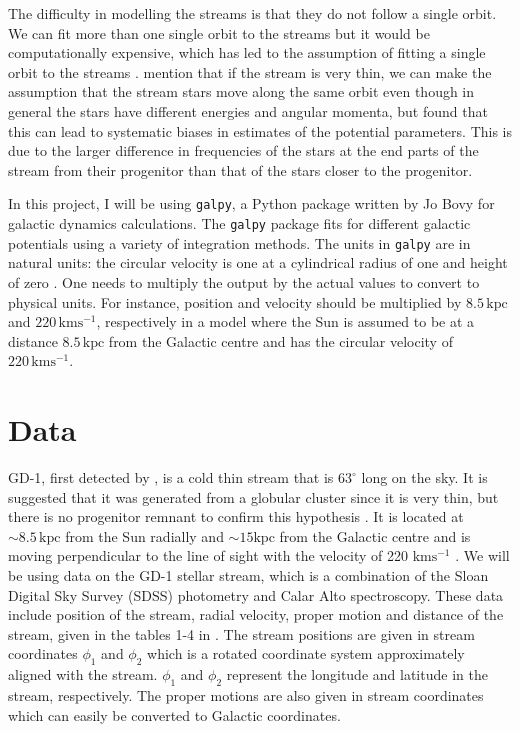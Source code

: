 \documentclass[preprint]{aastex}
\newcommand{\kpc}{\mathrm{kpc}}
\newcommand{\kms}{\mathrm{kms^{-1}}}
\begin{document}
The difficulty in modelling the streams is that they do not follow a single orbit. We can fit more than one single orbit to the streams but it would be computationally expensive, which has led to the assumption of fitting a single orbit to the streams \citep{Bovy2014}. \citet{koposov} mention that if the stream is very thin, we can make the assumption that the stream stars move along the same orbit even though in general the stars have different energies and angular momenta, but \citet{Sanders2013} found that this can lead to systematic biases in estimates of the potential parameters. This is due to the larger difference in frequencies of the stars at the end parts of the stream from their progenitor than that of the stars closer to the progenitor.

In this project, I will be using \texttt{galpy}, a Python package written by Jo Bovy \citep{galpy2015} for galactic dynamics calculations. The \texttt{galpy} package fits for different galactic potentials using a variety of integration methods. The units in \texttt{galpy} are in natural units: the circular velocity is one at a cylindrical radius of one and height of zero \citep{galpy2015}. One needs to multiply the output by the actual values to convert to physical units. For instance, position and velocity should be multiplied by $8.5 \, \kpc$ and $220 \, \kms$, respectively  in a model where the Sun is assumed to be at a distance $8.5 \, \kpc $ from the Galactic centre and has the circular velocity of $220 \, \kms$.



\section{Data}
GD-1, first detected by \citet{GD2006}, is a cold thin stream that is $63^{\circ}$ long on the sky. It is suggested that it was generated from a globular cluster since it is very thin, but there is no progenitor remnant to confirm this hypothesis \citep{Sanders2013}. It is located at $\sim 8.5 \, \kpc$ from the Sun radially and $ \sim15 \kpc$ from the Galactic centre and is moving perpendicular to the line of sight with the velocity of 220 $\kms$ \citep{koposov}.
We will be using data on the GD-1 stellar stream, which is a combination of the Sloan Digital Sky Survey (SDSS) photometry and Calar Alto spectroscopy. These data include position of the stream, radial velocity, proper motion and distance of the stream, given in the tables 1-4 in \citet{koposov}. The stream positions are given in stream coordinates $\phi_1$ and $\phi_2$ which is a rotated coordinate system approximately aligned with the stream. $\phi_1$ and $\phi_2$ represent the longitude and latitude in the stream, respectively. The proper motions are also given in stream coordinates which can easily be converted to Galactic coordinates. 
\end{document}
